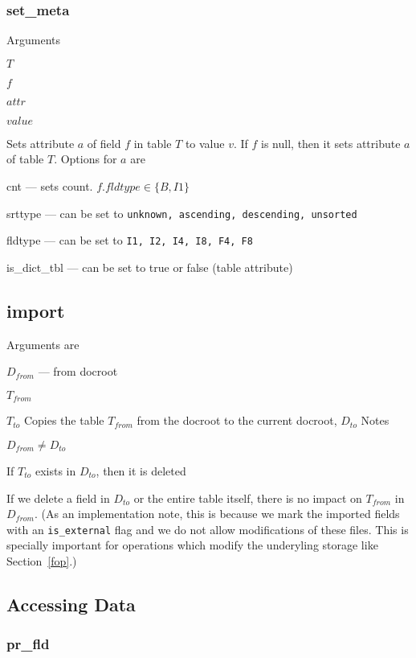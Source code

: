 \documentclass{report}
\begin{document}
\subsubsection{set\_meta}
\label{set_meta}
Arguments
\be
\item \(T\) 
\item \(f\) 
\item \(attr\) 
\item \(value\) 
\ee

Sets attribute \(a\) of field \(f\) in table \(T\) to value \(v\). If
\(f\) is null, then it sets attribute \(a\) of table \(T\).
Options for \(a\) are
\bd
\item [cnt] --- sets count. \(f.fldtype \in\{B, I1\}\)
\item [srttype] --- can be set to {\tt unknown, ascending, descending,
  unsorted}
\item [fldtype] --- can be set to {\tt I1, I2, I4, I8, F4, F8}
\item [is\_dict\_tbl] --- can be set to true or false (table attribute)
\ed

\subsection{import}
\label{import}
Arguments are
\be
\item \(D_{from}\) --- from docroot 
\item \(T_{from}\)
\item \(T_{to}\)
\ee
Copies the table \(T_{from}\) from the docroot to the current docroot,
       \(D_{to}\)
Notes
\be
\item \(D_{from} \neq D_{to}\)
\item If \(T_{to}\) exists in \(D_{to}\), then it is deleted
\item If we delete a field in \(D_{to}\) or the entire table itself,
there is no impact on \(T_{from}\) in \(D_{from}\). (As an
  implementation note, this is because we mark the imported fields with
  an \verb+is_external+ flag and we do not allow modifications of these
  files. This is specially important for operations which modify the
  underyling storage like Section~\ref{fop}.)
\ee

\subsection{Accessing Data}
\subsubsection{pr\_fld}
\end{document}
